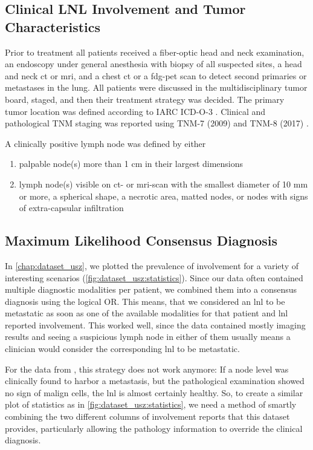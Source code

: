 \documentclass[\relativeRoot/main.tex]{subfiles}
\begin{document}
\subsection*{Clinical LNL Involvement and Tumor Characteristics}
\label{subsec:dataset_clb:methods:involvement}

Prior to treatment all patients received a fiber-optic head and neck examination, an endoscopy under general anesthesia with biopsy of all suspected sites, a head and neck \gls{ct} or \gls{mri}, and a chest \gls{ct} or a \gls{fdg-pet} scan to detect second primaries or metastases in the lung. All patients were discussed in the multidisciplinary tumor board, staged, and then their treatment strategy was decided. The primary tumor location was defined according to IARC ICD-O-3 \cite{fritz_international_2000}. Clinical and pathological TNM staging was reported using TNM-7 (2009) and TNM-8 (2017) \cite{brierley_tnm_2017}.

A clinically positive lymph node was defined by either

\begin{enumerate}[label={\alph*)}]
    \item palpable node(s) more than 1 cm in their largest dimensions
    \item lymph node(s) visible on \gls{ct}- or \gls{mri}-scan with the smallest diameter of 10 mm or more, a spherical shape, a necrotic area, matted nodes, or nodes with signs of extra-capsular infiltration
\end{enumerate}

\subsection*{Maximum Likelihood Consensus Diagnosis}
\label{subsec:dataset_clb:methods:max_llh}

In \cref{chap:dataset_usz}, we plotted the prevalence of involvement for a variety of interesting scenarios (\cref{fig:dataset_usz:statistics}). Since our data often contained multiple diagnostic modalities per patient, we combined them into a consensus diagnosis using the logical OR. This means, that we considered an \gls{lnl} to be metastatic as soon as one of the available modalities for that patient and \gls{lnl} reported involvement. This worked well, since the data contained mostly imaging results and seeing a suspicious lymph node in either of them usually means a clinician would consider the corresponding \gls{lnl} to be metastatic.

For the data from , this strategy does not work anymore: If a node level was clinically found to harbor a metastasis, but the pathological examination showed no sign of malign cells, the \gls{lnl} is almost certainly healthy. So, to create a similar plot of statistics as in \cref{fig:dataset_usz:statistics}, we need a method of smartly combining the two different columns of involvement reports that this dataset provides, particularly allowing the pathology information to override the clinical diagnosis.
\end{document}
